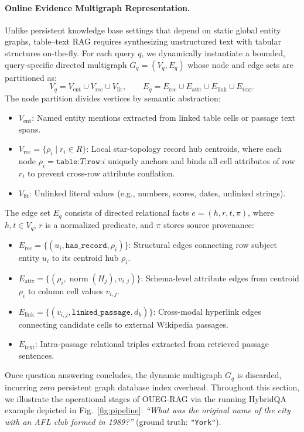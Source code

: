 \documentclass[runningheads]{llncs}
\begin{document}
\paragraph{Online Evidence Multigraph Representation.}
Unlike persistent knowledge base settings that depend on static global entity graphs, table--text RAG requires synthesizing unstructured text with tabular structures on-the-fly. For each query $q$, we dynamically instantiate a bounded, query-specific directed multigraph $G_q = (V_q, E_q)$ whose node and edge sets are partitioned as:
\begin{equation}
\label{eq:graph-partition}
V_q = V_{\text{ent}} \cup V_{\text{rec}} \cup V_{\text{lit}}, \qquad
E_q = E_{\text{rec}} \cup E_{\text{attr}} \cup E_{\text{link}} \cup E_{\text{text}}.
\end{equation}
The node partition divides vertices by semantic abstraction:
\begin{itemize}[leftmargin=1.5em]
    \item $V_{\text{ent}}$: Named entity mentions extracted from linked table cells or passage text spans.
    \item $V_{\text{rec}} = \{\rho_i \mid r_i \in R\}$: Local star-topology record hub centroids, where each node $\rho_i = \texttt{table:}T\texttt{:row:}i$ uniquely anchors and binds all cell attributes of row $r_i$ to prevent cross-row attribute conflation.
    \item $V_{\text{lit}}$: Unlinked literal values (e.g., numbers, scores, dates, unlinked strings).
\end{itemize}
The edge set $E_q$ consists of directed relational facts $e = (h, r, t, \pi)$, where $h, t \in V_q$, $r$ is a normalized predicate, and $\pi$ stores source provenance:
\begin{itemize}[leftmargin=1.5em]
    \item $E_{\text{rec}} = \{ (u_i, \texttt{has\_record}, \rho_i) \}$: Structural edges connecting row subject entity $u_i$ to its centroid hub $\rho_i$.
    \item $E_{\text{attr}} = \{ (\rho_i, \operatorname{norm}(H_j), v_{i,j}) \}$: Schema-level attribute edges from centroid $\rho_i$ to column cell values $v_{i,j}$.
    \item $E_{\text{link}} = \{ (v_{i,j}, \texttt{linked\_passage}, d_k) \}$: Cross-modal hyperlink edges connecting candidate cells to external Wikipedia passages.
    \item $E_{\text{text}}$: Intra-passage relational triples extracted from retrieved passage sentences.
\end{itemize}
Once question answering concludes, the dynamic multigraph $G_q$ is discarded, incurring zero persistent graph database index overhead. Throughout this section, we illustrate the operational stages of OUEG-RAG via the running HybridQA example depicted in Fig.~\ref{fig:pipeline}: \textit{``What was the original name of the city with an AFL club formed in 1989?''} (ground truth: \texttt{"York"}).
\end{document}
